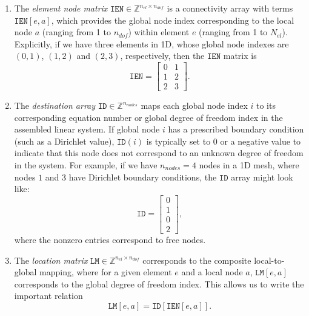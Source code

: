 \begin{enumerate}
    \item The \emph{element node matrix} $\texttt{IEN}\in \mathbb{Z}^{n_{el}\times n_{dof}}$ is a connectivity array with terms $\texttt{IEN}[e, a]$, which provides the global node index corresponding to the local node $a$ (ranging from 1 to $n_{dof}$) within element $e$ (ranging from 1 to $N_{el}$). Explicitly, if we have three elements in 1D, whose global node indexes are $(0,1)$, $(1,2)$ and $(2,3)$, respectively, then the $\texttt{IEN}$ matrix is 
    \begin{equation}
        \texttt{IEN} = \begin{bmatrix}
            0 & 1 \\
            1 & 2 \\
            2 & 3
        \end{bmatrix}.
    \end{equation}
    \item The \emph{destination array} $\texttt{ID}\in \mathbb{Z}^{n_{nodes}}$ maps each global node index $i$ to its corresponding equation number or global degree of freedom index in the assembled linear system. If global node $i$ has a prescribed boundary condition (such as a Dirichlet value), $\texttt{ID}(i)$ is typically set to 0 or a negative value to indicate that this node does not correspond to an unknown degree of freedom in the system. For example, if we have $n_{nodes}=4$ nodes in a 1D mesh, where nodes $1$ and $3$ have Dirichlet boundary conditions, the $\texttt{ID}$ array might look like:
    \begin{equation}
        \texttt{ID} = \begin{bmatrix}
            0 \\
            1 \\
            0 \\
            2
        \end{bmatrix},
    \end{equation}
    where the nonzero entries correspond to free nodes.
    \item The \emph{location matrix} $\texttt{LM}\in \mathbb{Z}^{n_{el}\times n_{dof}}$ corresponds to the composite local-to-global mapping, where for a given element $e$ and a local node $a$, $\texttt{LM}[e,a]$ corresponds to the global degree of freedom index. This allows us to write the important relation 
    \begin{equation}
        \texttt{LM}[e,a] = \texttt{ID}[\texttt{IEN}[e,a]].
    \end{equation}
\end{enumerate}
